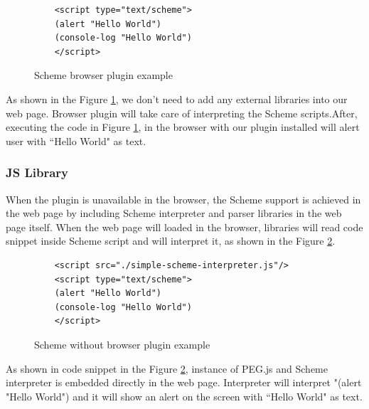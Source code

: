 \begin{figure}[h]
	\begin{lstlisting}  
	<script type="text/scheme">
	(alert "Hello World")
	(console-log "Hello World")
	</script>
	\end{lstlisting}
	\caption{Scheme browser plugin example}
	\label{fig:browserpluginscheme}
\end{figure}


As shown in the Figure \ref{fig:browserpluginscheme}, we don't need to add any external libraries into our web page. Browser plugin will take care of interpreting the Scheme scripts.After, executing the code in Figure \ref{fig:browserpluginscheme}, in the browser with our plugin installed will alert user with ``Hello World" as text.


\subsubsection{JS Library}

When the plugin is unavailable in the browser, the Scheme support is achieved in the web page by including Scheme interpreter and parser libraries in the web page itself. When the web page will loaded in the browser, libraries will read code snippet inside Scheme script and will interpret it, as shown in the Figure \ref{fig:browserwithoutpluginscheme}. 

\begin{figure}[h]
	\begin{lstlisting} 
	<script src="./simple-scheme-interpreter.js"/> 
	<script type="text/scheme">
	(alert "Hello World")
	(console-log "Hello World")
	</script>
	\end{lstlisting}
	\caption{Scheme without browser plugin example}
	\label{fig:browserwithoutpluginscheme}
\end{figure}



As shown in code snippet in the Figure \ref{fig:browserwithoutpluginscheme}, instance of PEG.js and Scheme interpreter is embedded directly in the web page. Interpreter will interpret "(alert "Hello World") and it will show an alert on the screen with ``Hello World" as text.